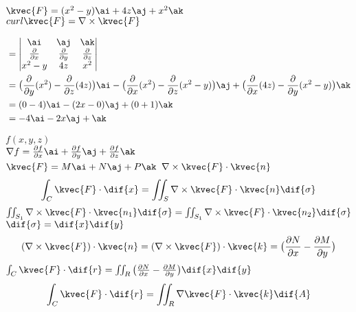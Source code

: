 
\(\kvec {F}=(x^{2}-y)\ai+4z\aj+x^{2}\ak\)\\
\(curl\kvec {F}=\nabla \times\kvec {F}\)

\begin{align*}
&=\begin{vmatrix}
\ai&\aj&\ak\\
\frac{\partial}{\partial x}&\frac{\partial}{\partial y}&\frac{\partial}{\partial z}\\
x^{2}-y&4z&x^{2}
\end{vmatrix}\\
&=\big(\frac{\partial}{\partial y}(x^{2})-\frac{\partial}{\partial z}(4z)\big)\ai-\big(\frac{\partial}{\partial x}(x^{2})-\frac{\partial}{\partial z}(x^{2}-y)\big)\aj+\big(\frac{\partial}{\partial x}(4z)-\frac{\partial}{\partial y}(x^{2}-y)\big)\ak\\
&=(0-4)\ai-(2x-0)\aj+(0+1)\ak\\
&=-4\ai-2x\aj+\ak
\end{align*}

\(f(x,y,z)\)\\
\(\nabla f=\frac{\partial f}{\partial x}\ai+\frac{\partial f}{\partial y}\aj+\frac{\partial f}{\partial z}\ak\)\\


\(\kvec{F}=M\ai+N\aj+P\ak\)
\(\nabla\times\kvec {F}\cdot\kvec {n}\)\\

\begin{align}
\int_{C}\kvec {F}\cdot\dif{x}=\iint_{S}\nabla\times\kvec {F}\cdot\kvec {n}\dif{\sigma}
\end{align}
\(\iint_{S_1}\nabla\times\kvec{F}\cdot\kvec{n_1}\dif{\sigma}=\iint_{S_1}\nabla\times\kvec{F}\cdot\kvec{n_2}\dif{\sigma}\)\\
\(\dif{\sigma}=\dif{x}\dif{y}\)\\

\begin{align}
(\nabla\times\kvec{F})\cdot\kvec{n}=(\nabla\times\kvec{F})\cdot\kvec{k}=\big(\frac{\partial N}{\partial x}-\frac{\partial M}{\partial y}\big)
\end{align}
\(\int_{C}\kvec{F}\cdot\dif{r}=\iint_{R}\big(\frac{\partial N}{\partial x}-\frac{\partial M}{\partial y}\big)\dif{x}\dif{y}\)\\

\begin{align}
\int_{C}\kvec{F}\cdot\dif{r}=\iint_{R}\nabla\kvec{F}\cdot\kvec{k}\dif{A}
\end{align}


